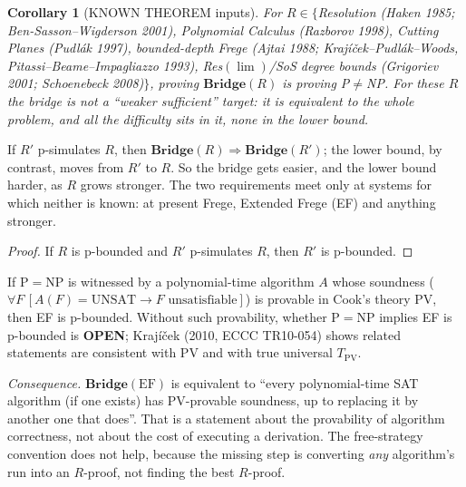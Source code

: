 \documentclass[11pt]{article}
\newtheorem{corollary}[theorem]{Corollary}
\theoremstyle{definition}\newtheorem{definition}[theorem]{Definition}
\begin{document}
\begin{corollary}[KNOWN THEOREM inputs]
For $R\in\{$Resolution (Haken 1985; Ben-Sasson--Wigderson 2001), Polynomial Calculus (Razborov 1998),
Cutting Planes (Pudlák 1997), bounded-depth Frege (Ajtai 1988; Krajíček--Pudlák--Woods, Pitassi--Beame--Impagliazzo 1993),
Res$(\lim)$/SoS degree bounds (Grigoriev 2001; Schoenebeck 2008)$\}$, proving $\mathbf{Bridge}(R)$ \emph{is} proving
P$\ne$NP. For these $R$ the bridge is not a ``weaker sufficient'' target: it is equivalent to the whole problem,
and all the difficulty sits in it, none in the lower bound.
\end{corollary}

\begin{proposition}\label{p:mono}
If $R'$ p-simulates $R$, then $\mathbf{Bridge}(R)\Rightarrow\mathbf{Bridge}(R')$; the lower bound, by contrast, moves from
$R'$ to $R$. So the bridge gets easier, and the lower bound harder, as $R$ grows stronger. The two requirements meet only at
systems for which neither is known: at present Frege, Extended Frege (EF) and anything stronger.
\end{proposition}
\begin{proof}If $R$ is p-bounded and $R'$ p-simulates $R$, then $R'$ is p-bounded.\end{proof}

\begin{proposition}\label{p:pv}
If $\mathrm P=\mathrm{NP}$ is witnessed by a polynomial-time algorithm $A$ whose soundness
($\forall F\,[A(F)=\mathrm{UNSAT}\to F\text{ unsatisfiable}]$) is provable in Cook's theory PV, then EF is p-bounded.
Without such provability, whether $\mathrm P=\mathrm{NP}$ implies EF is p-bounded is \textbf{OPEN}; Krajíček (2010, ECCC TR10-054)
shows related statements are consistent with PV and with true universal $T_{\mathrm{PV}}$.
\end{proposition}
\noindent\emph{Consequence.} $\mathbf{Bridge}(\mathrm{EF})$ is equivalent to ``every polynomial-time SAT algorithm (if one exists)
has PV-provable soundness, up to replacing it by another one that does''. That is a statement about the provability of
algorithm correctness, not about the cost of executing a derivation. The free-strategy convention does not help, because the missing
step is converting \emph{any} algorithm's run into an $R$-proof, not finding the best $R$-proof.
\end{document}
